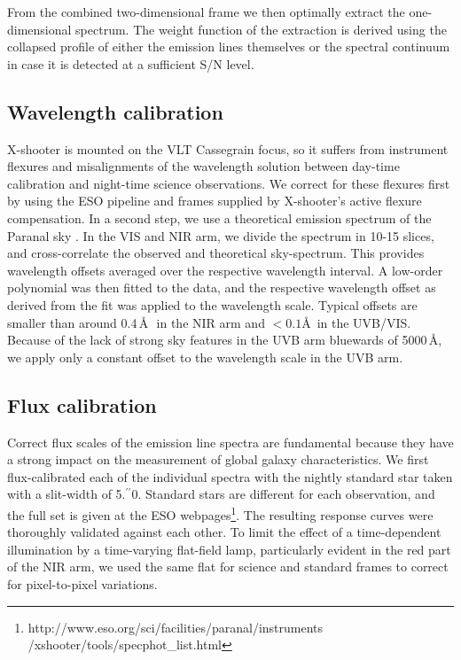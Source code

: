 \documentclass[traditabstract, longauth]{aa}
\newcommand{\farc}{\hbox{$.\!\!^{\prime\prime}$}}
\begin{document}
From the combined two-dimensional frame we then optimally extract the one-dimensional spectrum. The weight function of the extraction is derived using the collapsed profile of either the emission lines themselves or the spectral continuum in case it is detected at a sufficient S/N level.

\subsection{Wavelength calibration}
\label{sec:wavecal}

X-shooter is mounted on the VLT Cassegrain focus, so it suffers from instrument flexures and misalignments of the wavelength solution between day-time calibration and night-time science observations. We correct for these flexures first by using the ESO pipeline and frames supplied by X-shooter's active flexure compensation. In a second step, we use a theoretical emission spectrum of the Paranal sky \citep{2012A&A...543A..92N}. In the VIS and NIR arm, we divide the spectrum in 10-15 slices, and cross-correlate the observed and theoretical sky-spectrum. This provides wavelength offsets averaged over the respective wavelength interval. A low-order polynomial was then fitted to the data, and the respective wavelength offset as derived from the fit was applied to the wavelength scale. Typical offsets are smaller than around 0.4\,\AA\,\ in the NIR arm and $<0.1$\AA\, in the UVB/VIS. Because of the lack of strong sky features in the UVB arm bluewards of 5000\,\AA, we apply only a constant offset to the wavelength scale in the UVB arm.

\subsection{Flux calibration}
\label{FluxCal}

Correct flux scales of the emission line spectra are fundamental because they have a strong impact on the measurement of global galaxy characteristics. We first flux-calibrated each of the individual spectra with the nightly standard star taken with a slit-width of 5\farc{0}. Standard stars are different for each observation, and the full set is given at the ESO webpages\footnote{http://www.eso.org/sci/facilities/paranal/instruments\\/xshooter/tools/specphot\_list.html}. The resulting response curves were thoroughly validated against each other. To limit the effect of a time-dependent illumination by a time-varying flat-field lamp, particularly evident in the red part of the NIR arm, we used the same flat for science and standard frames to correct for pixel-to-pixel variations.
\end{document}
